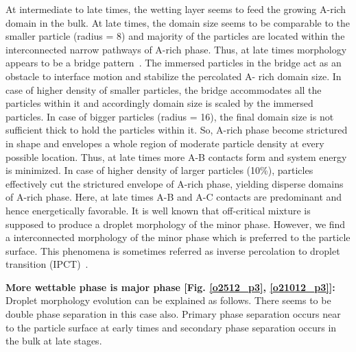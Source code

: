 \documentclass[12pt]{iiscthes}
\theoremstyle{definition}
\theoremstyle{definition}
\theoremstyle{remark}
\begin{document}
At intermediate to late times, the wetting layer seems to feed the growing A-rich domain in the bulk. At late times, the domain size seems to be comparable to the smaller particle (radius = 8) and majority of the particles are located within the interconnected narrow pathways of A-rich phase. Thus, at late times morphology appears to be a bridge pattern~\cite{RTanaka}. The immersed particles in the bridge act as an obstacle to interface motion and stabilize the percolated A- rich domain size. In case of higher density of smaller particles, the bridge accommodates all the particles within it and accordingly domain size is scaled by the immersed particles. In case of bigger particles (radius = 16), the final domain size is not sufficient thick to hold the particles within it. So, A-rich phase become strictured in shape and envelopes a whole region of moderate particle density at every possible location. Thus, at late times more A-B contacts form and system energy is minimized. In case of higher density of larger particles (10\%), particles effectively cut the strictured envelope of A-rich phase, yielding disperse domains of A-rich phase. Here, at late times A-B and A-C contacts are predominant and hence energetically favorable. It is well known that off-critical mixture is supposed to produce a droplet morphology of the minor phase. However, we find a interconnected morphology of the minor phase which is preferred to the particle surface. This phenomena is sometimes referred as inverse percolation to droplet transition (IPCT)~\cite{Ma}.       

\textbf{More wettable phase is major phase [Fig. \ref{o2512_p3}, \ref{o21012_p3}]:} Droplet morphology evolution can be explained as follows. There seems to be double phase separation in this case also. Primary phase separation occurs near to the particle surface at early times and secondary phase separation occurs in the bulk at late stages.
\end{document}
